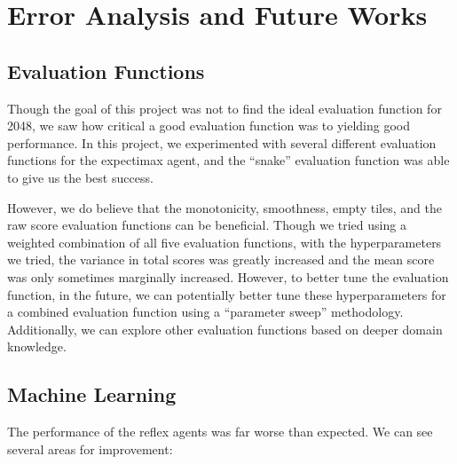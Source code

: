 \documentclass[9pt,twocolumn]{article}
\begin{document}
\section{Error Analysis and Future Works}

\subsection{Evaluation Functions}

Though the goal of this project was not to find the ideal evaluation function for 2048, we saw how critical a good evaluation function was to yielding good performance. In this project, we experimented with several different evaluation functions for the expectimax agent, and the “snake” evaluation function was able to give us the best success.

However, we do believe that the monotonicity, smoothness, empty tiles, and the raw score evaluation functions can be beneficial. Though we tried using a weighted combination of all five evaluation functions, with the hyperparameters we tried, the variance in total scores was greatly increased and the mean score was only sometimes marginally increased. However, to better tune the evaluation function, in the future, we can potentially better tune these hyperparameters for a combined evaluation function using a “parameter sweep” methodology. Additionally, we can explore other evaluation functions based on deeper domain knowledge.

\subsection{Machine Learning}

The performance of the reflex agents was far worse than expected. We can see several areas for improvement:
\end{document}
